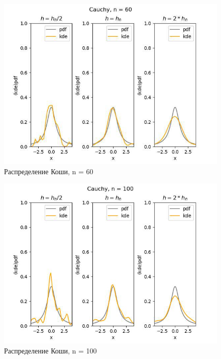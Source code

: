 \documentclass[../body.tex]{subfiles}
\begin{document}
\begin{figure}[H]
	\centering
	\includegraphics[width=\textwidth, height =0.4\textheight]{img/CauchyKDE n = 60.png}
	\caption{Распределение Коши, n = 60}
	\label{fig:cauchy_kde_60}
\end{figure}

\begin{figure}[H]
	\centering
	\includegraphics[width=\textwidth, height =0.4\textheight]{img/CauchyKDE n = 100.png}
	\caption{Распределение Коши, n = 100}
	\label{fig:cauchy_kde_100}
\end{figure}
\end{document}

